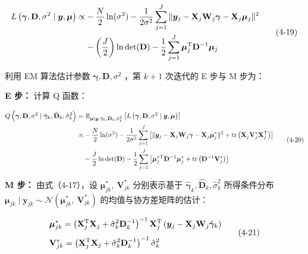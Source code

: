\documentclass[12pt,a4paper]{ctexart}
\makeatletter
\numberwithin{figure}{section}
\numberwithin{table}{section}
\let\ltx@orig@tag\tag
\renewcommand{\tag}[1]{\refstepcounter{equation}\ltx@orig@tag{#1}}%
\makeatother
\begin{document}
\begin{equation}
\begin{aligned}
L\left(\boldsymbol{\gamma},\mathbf{D},\sigma^{2}\mid\boldsymbol{y},\boldsymbol{\mu}\right)\propto&-\frac{N}{2}\ln(\sigma^{2})-\frac{1}{2\sigma^{2}}\sum_{j=1}^{J}\|\boldsymbol{y}_{j}-\mathbf{X}_{j}\mathbf{W}_{j}\boldsymbol{\gamma}-\mathbf{X}_{j}\boldsymbol{\mu}_{j}\|^{2}\\
&-\left(\frac{J}{2}\right)\ln\det(\mathbf{D})-\frac{1}{2}\sum_{j=1}^{J}\boldsymbol{\mu}_{j}^{\mathrm{T}}\mathbf{D}^{-1}\boldsymbol{\mu}_{j}
\end{aligned} \tag{4-19}
\end{equation}

利用 EM 算法估计参数 $\boldsymbol{\gamma},\mathbf{D},\sigma^{2}$ ，第 $k+1$ 次迭代的 E 步与 M 步为：

\textbf{E 步：} 计算 Q 函数：

\begin{equation}
\begin{aligned}
Q\left(\boldsymbol{\gamma},\mathbf{D},\sigma^{2}\mid\hat{\boldsymbol{\gamma}}_{k},\hat{\mathbf{D}}_{k},\hat{\sigma}_{k}^{2}\right)=&\ \mathbb{E}_{\boldsymbol{\mu}\mid\boldsymbol{y},\hat{\boldsymbol{\gamma}}_{k},\hat{\mathbf{D}}_{k},\hat{\sigma}_{k}^{2}}\left[L\left(\boldsymbol{\gamma},\mathbf{D},\sigma^{2}\mid\boldsymbol{y},\boldsymbol{\mu}\right)\right]\\
\propto&-\frac{N}{2}\ln(\sigma^{2})-\frac{1}{2\sigma^{2}}\sum_{j=1}^{J}\left[\|\boldsymbol{y}_{j}-\mathbf{X}_{j}\mathbf{W}_{j}\boldsymbol{\gamma}-\mathbf{X}_{j}\boldsymbol{\mu}_{j}^{*}\|^{2}+\operatorname{tr}\left(\mathbf{X}_{j}\mathbf{V}_{j}^{*}\mathbf{X}_{j}^{\mathrm{T}}\right)\right]\\
&-\frac{J}{2}\ln\det(\mathbf{D})-\frac{1}{2}\sum_{j=1}^{J}\left[\boldsymbol{\mu}_{j}^{*\mathrm{T}}\mathbf{D}^{-1}\boldsymbol{\mu}_{j}^{*}+\operatorname{tr}\left(\mathbf{D}^{-1}\mathbf{V}_{j}^{*}\right)\right]
\end{aligned} \tag{4-20}
\end{equation}

\textbf{M 步：} 由式（4-17），设 $\boldsymbol{\mu}_{jk}^{*},\ \mathbf{V}_{jk}^{*}$ 分别表示基于 $\hat{\boldsymbol{\gamma}}_{k},\hat{\mathbf{D}}_{k},\hat{\sigma}_{k}^{2}$ 所得条件分布 $\boldsymbol{\mu}_{jk}\mid\boldsymbol{y}_{jk}\sim\mathcal{N}\left(\boldsymbol{\mu}_{jk}^{*},\ \mathbf{V}_{jk}^{*}\right)$ 的均值与协方差矩阵的估计：

\begin{equation}
\begin{aligned}
&\boldsymbol{\mu}_{jk}^{*}=\left(\mathbf{X}_{j}^{\mathrm{T}}\mathbf{X}_{j}+\hat{\sigma}_{k}^{2}\mathbf{D}_{k}^{-1}\right)^{-1}\mathbf{X}_{j}^{\mathrm{T}}\left(\boldsymbol{y}_{j}-\mathbf{X}_{j}\mathbf{W}_{j}\hat{\boldsymbol{\gamma}}_{k}\right)\\[4pt]
&\mathbf{V}_{jk}^{*}=\left(\mathbf{X}_{j}^{\mathrm{T}}\mathbf{X}_{j}+\hat{\sigma}_{k}^{2}\mathbf{D}_{k}^{-1}\right)^{-1}\hat{\sigma}_{k}^{2}
\end{aligned} \tag{4-21}
\end{equation}
\end{document}
